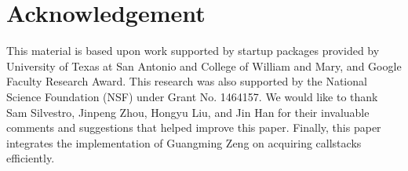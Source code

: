 \section*{Acknowledgement}

This material is based upon work supported by %
startup packages provided by University of Texas at San Antonio and College of William and Mary, and Google Faculty Research Award. This research was also supported by the National Science Foundation (NSF) under Grant No. 1464157. We would like to thank Sam Silvestro, Jinpeng Zhou, Hongyu Liu, and Jin Han for their invaluable comments and suggestions that helped improve this paper. Finally, this paper integrates the implementation of Guangming Zeng on acquiring callstacks efficiently.